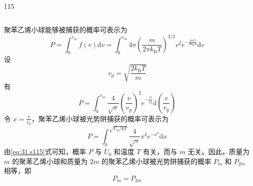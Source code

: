 \begin{solution}{115}
\begin{subsolution}
\begin{equation}
            \label{eq:27.s115}
        \end{equation}
    \end{subsolution}
    \begin{subsolution}
        聚苯乙烯小球能够被捕获的概率可表示为
        \begin{equation}
            P = \int_{0}^{v_{m}} f(v) \mathrm{d} v = \int_{0}^{v_{m}} 4\pi \left(\frac{m}{2\pi k_{\mathrm{B}} T}\right)^{3/2} v^{2} e^{- \frac{m v^{2}}{2 k_{\mathrm{B}} T}} \mathrm{d} v
            \label{eq:28.s115}
        \end{equation}
        设
        \begin{equation}
            v_{\mathrm{p}} = \sqrt{\frac{2 k_{\mathrm{B}} T}{m}}
            \label{eq:29.s115}
        \end{equation}
        有
        \begin{equation}
            P = \int_{0}^{v_{m}} \frac{4}{\sqrt{\pi}} \left(\frac{v}{v_{\mathrm{p}}}\right)^{2} e^{- \frac{v^{2}}{v_{\mathrm{p}}^{2}}} \mathrm{d} \left(\frac{v}{v_{\mathrm{p}}}\right)
            \label{eq:30.s115}
        \end{equation}
        令 $x = \frac{v}{v_{\mathrm{p}}}$，聚苯乙烯小球被光势阱捕获的概率可表示为
        \begin{equation}
            P = \int_{0}^{\sqrt{U_{0} / k T}} \frac{4}{\sqrt{\pi}} x^{2} e^{- x^{2}} \mathrm{d} x
            \label{eq:31.s115}
        \end{equation}
        由\eqref{eq:31.s115}式可知，概率 $P$ 与 $U_{0}$ 和温度 $T$ 有关，而与 $m$ 无关。因此，质量为 $m$ 的聚苯乙烯小球和质量为 $2m$ 的聚苯乙烯小球被光势阱捕获的概率 $P_{m}$ 和 $P_{2m}$ 相等，即
        \begin{equation}
            P_{m} = P_{2m}
            \label{eq:32.s115}
        \end{equation}
    \end{subsolution}
\end{solution}